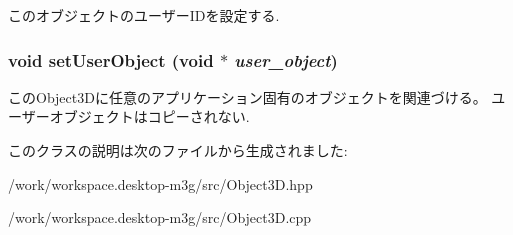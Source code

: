 このオブジェクトのユーザーIDを設定する. \hypertarget{classm3g_1_1Object3D_2285b0af7d6d293c4cf0e0d4559fd9b5}{
\subsubsection[{setUserObject}]{\setlength{\rightskip}{0pt plus 5cm}void setUserObject (void $\ast$ {\em user\_\-object})}}
\label{classm3g_1_1Object3D_2285b0af7d6d293c4cf0e0d4559fd9b5}


このObject3Dに任意のアプリケーション固有のオブジェクトを関連づける。 ユーザーオブジェクトはコピーされない. 

このクラスの説明は次のファイルから生成されました:\begin{CompactItemize}
\item 
/work/workspace.desktop-m3g/src/Object3D.hpp\item 
/work/workspace.desktop-m3g/src/Object3D.cpp\end{CompactItemize}
